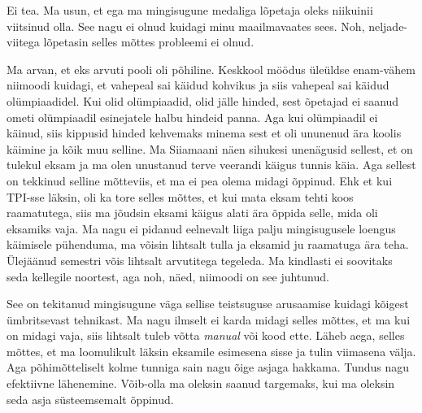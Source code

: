 
Ei tea. Ma usun, et ega ma mingisugune medaliga lõpetaja oleks niikuinii viitsinud olla. See nagu ei olnud kuidagi minu maailmavaates sees. Noh, neljade-viitega lõpetasin selles mõttes probleemi ei olnud.


Ma arvan, et eks arvuti pooli oli põhiline. Keskkool möödus üleüldse enam-vähem niimoodi  kuidagi, et vahepeal sai käidud kohvikus ja siis vahepeal sai käidud olümpiaadidel. Kui olid olümpiaadid, olid jälle hinded, sest õpetajad ei saanud ometi olümpiaadil esinejatele halbu hindeid panna. Aga kui olümpiaadil ei käinud, siis kippusid hinded kehvemaks minema sest et oli ununenud ära koolis käimine ja kõik muu selline.  Ma Siiamaani näen sihukesi  unenägusid sellest, et on tulekul eksam ja ma olen unustanud terve veerandi käigus tunnis käia. Aga sellest on  tekkinud selline  mõtteviis, et ma ei pea olema midagi õppinud. Ehk et kui TPI-sse läksin, oli ka tore selles mõttes, et kui mata eksam tehti koos raamatutega, siis ma jõudsin eksami käigus alati ära õppida selle, mida oli eksamiks vaja. Ma nagu ei pidanud  eelnevalt liiga palju mingisugusele loengus käimisele pühenduma, ma võisin lihtsalt tulla ja eksamid ju raamatuga  ära teha. Ülejäänud semestri võis lihtsalt arvutitega tegeleda. Ma kindlasti ei soovitaks seda kellegile noortest, aga noh, näed, niimoodi on see juhtunud. 

See on tekitanud mingisugune väga sellise teistsuguse arusaamise kuidagi kõigest ümbritsevast tehnikast. Ma nagu  ilmselt ei karda midagi selles mõttes, et ma kui on midagi vaja, siis lihtsalt tuleb võtta \emph{manual}  või kood ette. Läheb aega, selles mõttes, et ma loomulikult läksin eksamile esimesena sisse ja tulin viimasena välja. Aga  põhimõtteliselt kolme tunniga sain nagu õige asjaga hakkama. Tundus nagu efektiivne lähenemine. Võib-olla ma  oleksin saanud targemaks, kui ma oleksin seda asja süsteemsemalt õppinud. 


